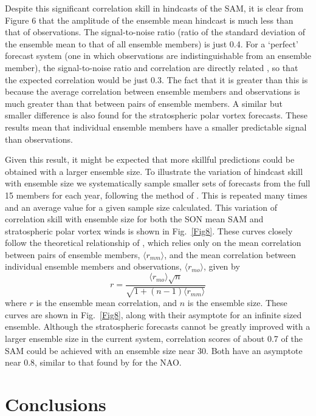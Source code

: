 Despite this significant correlation skill in hindcasts of the SAM, it is clear from Figure 6 that the amplitude of the ensemble mean hindcast is much less than that of observations. The signal-to-noise ratio (ratio of the standard deviation of the ensemble mean to that of all ensemble members) is just 0.4. For a `perfect' forecast system (one in which observations are indistinguishable from an ensemble member), the signal-to-noise ratio and correlation are directly related \citep{Kumar2009}, so that the expected correlation would be just 0.3. The fact that it is greater than this is because the average correlation between ensemble members and observations is much greater than that between pairs of ensemble members. A similar but smaller difference is also found for the stratospheric polar vortex forecasts. These results mean that individual ensemble members have a smaller predictable signal than observations.

Given this result, it might be expected that more skillful predictions could be obtained with a larger ensemble size. To illustrate the variation of hindcast skill with ensemble size we systematically sample smaller sets of forecasts from the full 15 members for each year, following the method of \citet{Scaife2013}. This is repeated many times and an average value for a given sample size calculated. This variation of correlation skill with ensemble size for both the SON mean SAM and stratospheric polar vortex winds is shown in Fig.\ \ref{Fig8}. These curves closely follow the theoretical relationship of \citet{Murphy1990}, which relies only on the mean correlation between pairs of ensemble members, $\langle r_{mm} \rangle$, and the mean correlation between individual ensemble members and observations, $\langle r_{mo} \rangle$, given by
\begin{equation}
r = \frac{\langle r_{mo} \rangle \sqrt{n}}{\sqrt{1+(n-1)\langle r_{mm} \rangle}}
\end{equation} 
where $r$ is the ensemble mean correlation, and $n$ is the ensemble size. These curves are shown in Fig.\ \ref{Fig8}, along with their asymptote for an infinite sized ensemble. Although the stratospheric forecasts cannot be greatly improved with a larger ensemble size in the current system, correlation scores of about 0.7 of the SAM could be achieved with an ensemble size near 30. Both have an asymptote near 0.8, similar to that found by \citet{Scaife2013} for the NAO.  


\section{Conclusions}


